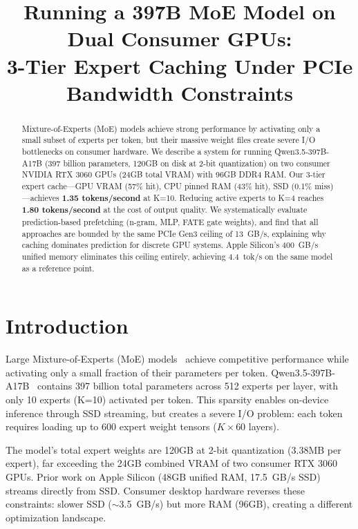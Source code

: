 \documentclass[conference]{IEEEtran}
\title{Running a 397B MoE Model on Dual Consumer GPUs:\\3-Tier Expert Caching Under PCIe Bandwidth Constraints}
\author{
\IEEEauthorblockN{Anonymous}
\IEEEauthorblockA{Under Review}
}
\begin{document}
\maketitle

\begin{abstract}
Mixture-of-Experts (MoE) models achieve strong performance by activating only a small subset of experts per token, but their massive weight files create severe I/O bottlenecks on consumer hardware. We describe a system for running Qwen3.5-397B-A17B (397 billion parameters, 120GB on disk at 2-bit quantization) on two consumer NVIDIA RTX 3060 GPUs (24GB total VRAM) with 96GB DDR4 RAM. Our 3-tier expert cache---GPU VRAM (57\% hit), CPU pinned RAM (43\% hit), SSD (0.1\% miss)---achieves \textbf{1.35 tokens/second} at K=10. Reducing active experts to K=4 reaches \textbf{1.80 tokens/second} at the cost of output quality. We systematically evaluate prediction-based prefetching (n-gram, MLP, FATE gate weights), and find that all approaches are bounded by the same PCIe Gen3 ceiling of 13~GB/s, explaining why caching dominates prediction for discrete GPU systems. Apple Silicon's 400~GB/s unified memory eliminates this ceiling entirely, achieving 4.4~tok/s on the same model as a reference point.
\end{abstract}

\section{Introduction}

Large Mixture-of-Experts (MoE) models~\cite{shazeer2017outrageously,fedus2022switch} achieve competitive performance while activating only a small fraction of their parameters per token. Qwen3.5-397B-A17B~\cite{qwen3.5} contains 397 billion total parameters across 512 experts per layer, with only 10 experts (K=10) activated per token. This sparsity enables on-device inference through SSD streaming, but creates a severe I/O problem: each token requires loading up to 600 expert weight tensors ($K \times 60$ layers).

The model's total expert weights are 120GB at 2-bit quantization (3.38MB per expert), far exceeding the 24GB combined VRAM of two consumer RTX 3060 GPUs. Prior work on Apple Silicon (48GB unified RAM, 17.5~GB/s SSD) streams directly from SSD. Consumer desktop hardware reverses these constraints: slower SSD ($\sim$3.5~GB/s) but more RAM (96GB), creating a different optimization landscape.
\end{document}
